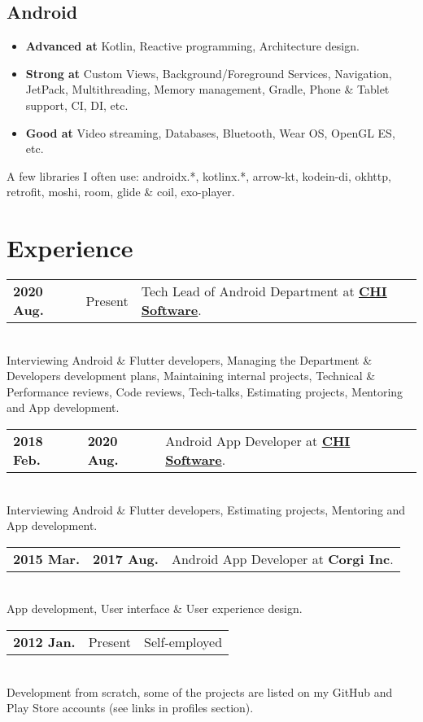 \documentclass[a4paper]{article}
\begin{document}
	\subsection*{Android}
	\begin{multicols}{2}
	\begin{itemize}
		\item \textbf{Advanced at} Kotlin, Reactive programming, Architecture design.
		\item \textbf{Strong at} Custom Views, Background/Foreground Services, Navigation, JetPack, Multithreading, Memory management, Gradle, Phone \& Tablet support, CI, DI, etc.
		\item \textbf{Good at} Video streaming, Databases, Bluetooth, Wear OS, OpenGL ES, etc.
	\end{itemize}
	\end{multicols}
	
	{ \footnotesize
	A few libraries I often use: androidx.*, kotlinx.*, arrow-kt, kodein-di, okhttp, retrofit, moshi, room, glide \& coil, exo-player.       
	}
	
	\section*{Experience}
	\begin{tabular}{@{}l@{\enspace--\enspace}ll}
		\textbf{2020 Aug.} & Present & Tech Lead of Android Department at \href{https://chisw.com}{\textbf{CHI Software}}. \\
	\end{tabular} \\[0.2em]
	Interviewing Android \& Flutter developers, Managing the Department \& Developers development plans, Maintaining internal projects, Technical \& Performance reviews, Code reviews, Tech-talks, Estimating projects, Mentoring and App development. \\[0.4em]
	\begin{tabular}{@{}l@{\enspace--\enspace}ll}
		\textbf{2018 Feb.} & \textbf{2020 Aug.} & Android App Developer at \href{https://chisw.com}{\textbf{CHI Software}}. \\
	\end{tabular} \\[0.2em]
	Interviewing Android \& Flutter developers, Estimating projects, Mentoring and App development.  \\[0.4em]   
	\begin{tabular}{@{}l@{\enspace--\enspace}ll}
		\textbf{2015 Mar.} & \textbf{2017 Aug.} & Android App Developer at \textbf{Corgi Inc}. \\
	\end{tabular} \\[0.2em]
	App development, User interface \& User experience design.   \\[0.4em]   
	\begin{tabular}{@{}l@{\enspace--\enspace}ll}
		\textbf{2012 Jan.} & Present & Self-employed \\
	\end{tabular} \\[0.2em]
	Development from scratch, some of the projects are listed on my GitHub and Play Store accounts (see links in profiles section).   
\end{document}
